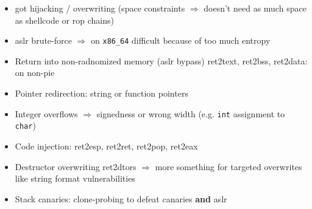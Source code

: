 \begin{itemize}
	\item{
		\gls{got} hijacking / overwriting (space constraints $\Rightarrow$ doesn't need as much space as shellcode or \gls{rop} chains) \cmark
	}
	\item{
		\gls{aslr} brute-force $\Rightarrow$ on \texttt{x86\_64} difficult because of too much entropy
	}
	\item{
		Return into non-radnomized memory (\gls{aslr} bypass) ret2text, ret2bss, ret2data: on non-\gls{pie} \cmark
	}
	\item{
		Pointer redirection: string or function pointers
	}
	\item{
		Integer overflows $\Rightarrow$ signedness or wrong width (e.g. \texttt{int} assignment to \texttt{char})
	}
	\item{
		Code injection: ret2esp, ret2ret, ret2pop, ret2eax \cmark
	}
	\item{
		Destructor overwriting ret2dtors $\Rightarrow$ more something for targeted overwrites like string format vulnerabilities
	}
	\item{
		Stack canaries: clone-probing to defeat canaries \textbf{and} \gls{aslr} \cmark
	}
\end{itemize}
